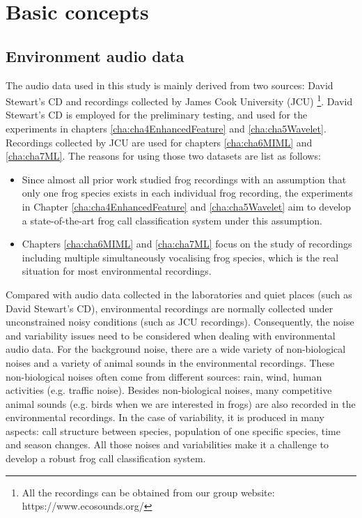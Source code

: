 \section{Basic concepts} 

\subsection{Environment audio data}
The audio data used in this study is mainly derived from two sources: David Stewart's CD \citep{CD} and recordings collected by James Cook University (JCU) \footnote{All the recordings can be obtained from our group website: https://www.ecosounds.org/}. 
David Stewart's CD is employed for the preliminary testing, and used for the experiments in chapters \ref{cha:cha4EnhancedFeature} and \ref{cha:cha5Wavelet}. 
Recordings collected by JCU are used for chapters \ref{cha:cha6MIML} and \ref{cha:cha7ML}. 
The reasons for using those two datasets are list as follows:
\begin{itemize}
\item  Since almost all prior work studied frog recordings with an assumption that only one frog species exists in each individual frog recording, the experiments in Chapter \ref{cha:cha4EnhancedFeature} and \ref{cha:cha5Wavelet} aim to develop a state-of-the-art frog call classification system under this assumption. 

\item  Chapters \ref{cha:cha6MIML} and \ref{cha:cha7ML} focus on the  
study of recordings including multiple simultaneously vocalising frog species, which is the real situation for most environmental recordings. 


\end{itemize}




Compared with audio data collected in the laboratories and quiet places (such as David Stewart’s CD), environmental recordings are normally collected under unconstrained noisy conditions (such as JCU recordings). Consequently, the noise and variability issues need to be considered when dealing with environmental audio data. For the background noise, there are a wide variety of non-biological noises and a variety of animal sounds in the environmental recordings. These non-biological noises often come from different sources: rain, wind, human activities (e.g. traffic noise). Besides non-biological noises, many competitive animal sounds (e.g. birds when we are interested in frogs) are also recorded in the environmental  recordings. In the case of variability, it is produced in many aspects: call structure between species, population of one specific species, time and season changes. All those noises and variabilities make it a challenge to develop a robust frog call classification system.




